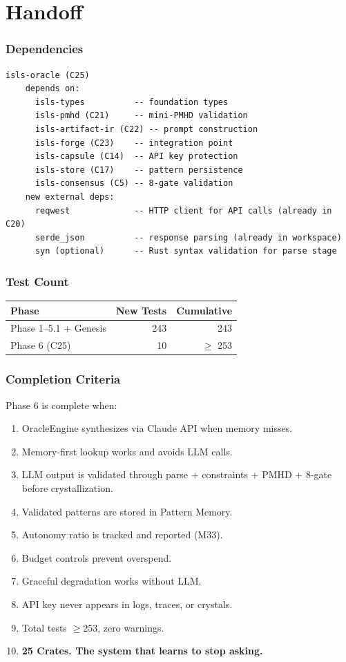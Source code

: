 \documentclass[11pt,a4paper,twoside]{article}
\theoremstyle{definition}
\theoremstyle{plain}
\theoremstyle{remark}
\begin{document}
\part{Handoff}\label{part:handoff}

\section{Dependencies}

\begin{lstlisting}
isls-oracle (C25)
    depends on:
      isls-types          -- foundation types
      isls-pmhd (C21)     -- mini-PMHD validation
      isls-artifact-ir (C22) -- prompt construction
      isls-forge (C23)    -- integration point
      isls-capsule (C14)  -- API key protection
      isls-store (C17)    -- pattern persistence
      isls-consensus (C5) -- 8-gate validation
    new external deps:
      reqwest             -- HTTP client for API calls (already in C20)
      serde_json          -- response parsing (already in workspace)
      syn (optional)      -- Rust syntax validation for parse stage
\end{lstlisting}

\section{Test Count}

\begin{tabular}{l r r}
\toprule
\textbf{Phase} & \textbf{New Tests} & \textbf{Cumulative} \\
\midrule
Phase 1--5.1 + Genesis & 243 & 243 \\
Phase 6 (C25) & 10 & $\ge$ 253 \\
\bottomrule
\end{tabular}

\section{Completion Criteria}

Phase 6 is complete when:
\begin{enumerate}[nosep]
  \item OracleEngine synthesizes via Claude API when memory misses.
  \item Memory-first lookup works and avoids LLM calls.
  \item LLM output is validated through parse + constraints + PMHD
        + 8-gate before crystallization.
  \item Validated patterns are stored in Pattern Memory.
  \item Autonomy ratio is tracked and reported (M33).
  \item Budget controls prevent overspend.
  \item Graceful degradation works without LLM.
  \item API key never appears in logs, traces, or crystals.
  \item Total tests $\ge 253$, zero warnings.
  \item \textbf{25 Crates. The system that learns to stop asking.}
\end{enumerate}
\end{document}
